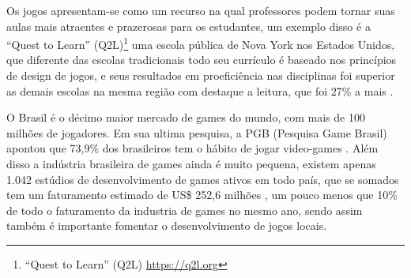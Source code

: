 Os jogos apresentam-se como um recurso na qual professores podem tornar suas aulas mais atraentes e prazerosas para os estudantes, um exemplo disso é a “Quest to Learn” (Q2L)\footnote{“Quest to Learn” (Q2L) \url{https://q2l.org}} uma escola pública de Nova York nos Estados Unidos, que diferente das escolas tradicionais todo seu currículo é baseado nos princípios de design de jogos, e seus resultados em proeficiência nas disciplinas foi superior as demais escolas na mesma região com destaque a leitura, que foi 27\% a mais \cite{Q2L}.

O Brasil é o décimo maior mercado de games do mundo, com mais de 100 milhões de jogadores.
Em sua ultima pesquisa, a PGB (Pesquisa Game Brasil) apontou que 73,9\% dos brasileiros tem o hábito de jogar video-games \cite{PGB}. Além disso a indústria brasileira de games ainda é muito pequena, existem apenas 1.042 estúdios de desenvolvimento de games ativos em todo país, que se somados tem um faturamento estimado de US\$ 252,6 milhões \cite{Abragames}, um pouco menos que 10\% de todo o faturamento da industria de games no mesmo ano, sendo assim também é importante fomentar o desenvolvimento de jogos locais.









